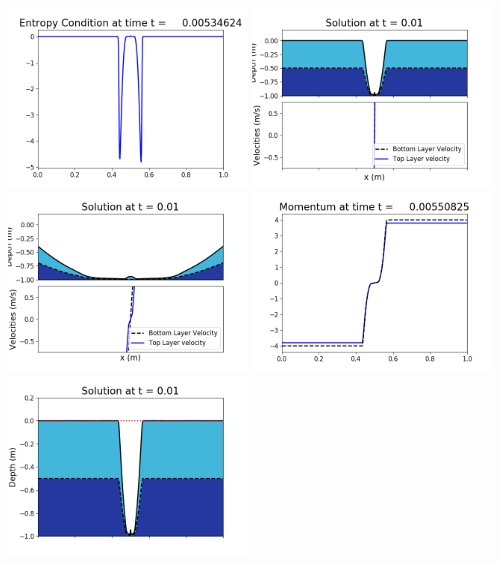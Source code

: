 \documentclass[11pt]{article}
\begin{document}
\vskip 10pt 
\includegraphics[width=0.475\textwidth]{frame0034fig1009.png}
\vskip 10pt 
\includegraphics[width=0.475\textwidth]{frame0035fig1001.png}
\includegraphics[width=0.475\textwidth]{frame0035fig1002.png}
\vskip 10pt 
\includegraphics[width=0.475\textwidth]{frame0035fig1003.png}
\includegraphics[width=0.475\textwidth]{frame0035fig1006.png}
\end{document}
